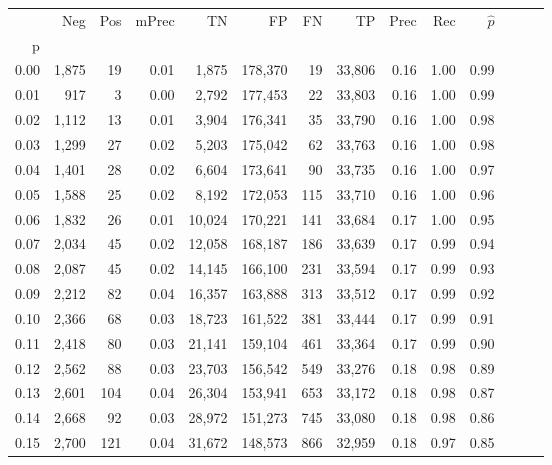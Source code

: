 \begin{tabular}{rrrrrrrrrrrrrr}
\toprule
{} &    Neg &  Pos & mPrec &       TN &       FP &      FN &      TP &  Prec &   Rec & $\hat{p}$ \\
p    &        &      &       &          &          &         &         &       &       &           \\
\midrule
0.00 &  1,875 &   19 &  0.01 &    1,875 &  178,370 &      19 &  33,806 &  0.16 &  1.00 &      0.99 \\
0.01 &    917 &    3 &  0.00 &    2,792 &  177,453 &      22 &  33,803 &  0.16 &  1.00 &      0.99 \\
0.02 &  1,112 &   13 &  0.01 &    3,904 &  176,341 &      35 &  33,790 &  0.16 &  1.00 &      0.98 \\
0.03 &  1,299 &   27 &  0.02 &    5,203 &  175,042 &      62 &  33,763 &  0.16 &  1.00 &      0.98 \\
0.04 &  1,401 &   28 &  0.02 &    6,604 &  173,641 &      90 &  33,735 &  0.16 &  1.00 &      0.97 \\
0.05 &  1,588 &   25 &  0.02 &    8,192 &  172,053 &     115 &  33,710 &  0.16 &  1.00 &      0.96 \\
0.06 &  1,832 &   26 &  0.01 &   10,024 &  170,221 &     141 &  33,684 &  0.17 &  1.00 &      0.95 \\
0.07 &  2,034 &   45 &  0.02 &   12,058 &  168,187 &     186 &  33,639 &  0.17 &  0.99 &      0.94 \\
0.08 &  2,087 &   45 &  0.02 &   14,145 &  166,100 &     231 &  33,594 &  0.17 &  0.99 &      0.93 \\
0.09 &  2,212 &   82 &  0.04 &   16,357 &  163,888 &     313 &  33,512 &  0.17 &  0.99 &      0.92 \\
0.10 &  2,366 &   68 &  0.03 &   18,723 &  161,522 &     381 &  33,444 &  0.17 &  0.99 &      0.91 \\
0.11 &  2,418 &   80 &  0.03 &   21,141 &  159,104 &     461 &  33,364 &  0.17 &  0.99 &      0.90 \\
0.12 &  2,562 &   88 &  0.03 &   23,703 &  156,542 &     549 &  33,276 &  0.18 &  0.98 &      0.89 \\
0.13 &  2,601 &  104 &  0.04 &   26,304 &  153,941 &     653 &  33,172 &  0.18 &  0.98 &      0.87 \\
0.14 &  2,668 &   92 &  0.03 &   28,972 &  151,273 &     745 &  33,080 &  0.18 &  0.98 &      0.86 \\
0.15 &  2,700 &  121 &  0.04 &   31,672 &  148,573 &     866 &  32,959 &  0.18 &  0.97 &      0.85 \\

\end{tabular}
